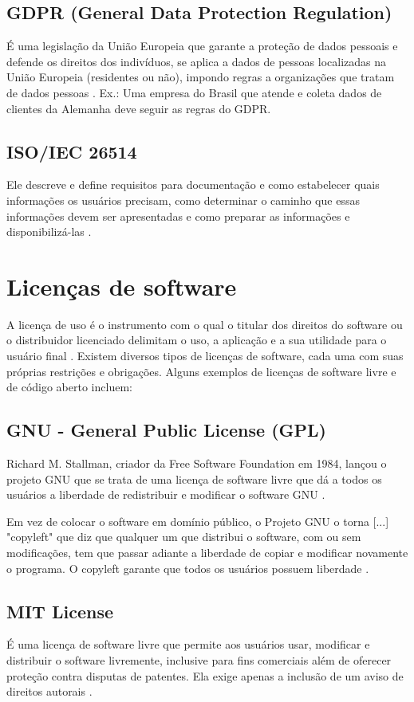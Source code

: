 \documentclass[12pt,oneside,a4paper,article]{abntex2}
\begin{document}
\subsection{GDPR (General Data Protection Regulation)}
É uma legislação da União Europeia que garante a proteção de dados pessoais e defende os direitos dos indivíduos, se aplica a dados de pessoas localizadas na União Europeia (residentes ou não), impondo regras a organizações que tratam de dados pessoas \cite{GDPR}. Ex.: Uma empresa do Brasil que atende e coleta dados de clientes da Alemanha deve seguir as regras do GDPR.

\subsection{ISO/IEC 26514}Ele descreve e define requisitos para documentação e como estabelecer quais informações os usuários precisam, como determinar o caminho que essas informações devem ser apresentadas e como preparar as informações e disponibilizá-las \cite{ISO26514}.

\section{Licenças de software}

A licença de uso é o instrumento com o qual o titular dos
direitos do software ou o distribuidor licenciado delimitam o uso, a aplicação e a sua utilidade para o usuário final \cite{nettoquestoes}. Existem diversos tipos de licenças de software, cada uma com suas próprias restrições e obrigações. Alguns exemplos de licenças de software livre e de código aberto incluem:

\subsection{GNU - General Public License (GPL)} Richard M. Stallman, criador da Free Software Foundation em 1984, lançou o projeto GNU que se trata de uma licença de software livre que dá a todos os usuários a liberdade de redistribuir e modificar o software GNU \cite{GPLv3}.

Em vez de colocar o software em domínio público, o Projeto GNU o torna [...] "copyleft"  que diz que qualquer um que distribui o software, com ou sem modificações, tem que passar adiante a liberdade de copiar e modificar novamente o programa. O copyleft garante que todos os usuários possuem liberdade \cite{nettoquestoes}.

\subsection{MIT License}
É uma licença de software livre que permite aos usuários usar, modificar e distribuir o software livremente, inclusive para fins comerciais além de oferecer proteção contra disputas de patentes. Ela exige apenas a inclusão de um aviso de direitos autorais \cite{MITLicense}.
\end{document}
